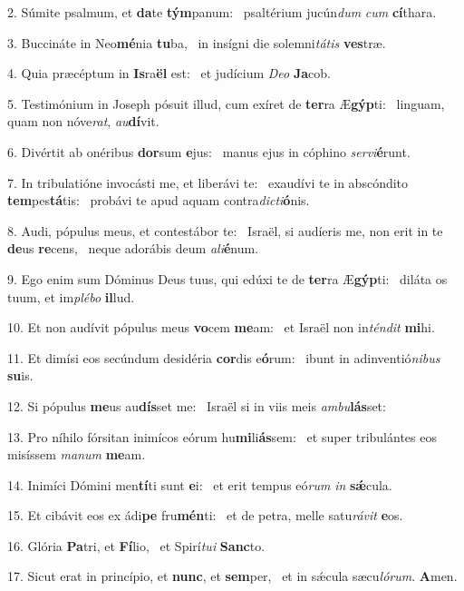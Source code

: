 2. Súmite psalmum, et \textbf{da}te \textbf{tým}panum: \ast\  psaltérium jucún\textit{dum} \textit{cum} \textbf{cí}thara.\

3. Buccináte in Neo\textbf{mé}nia \textbf{tu}ba, \ast\  in insígni die solemni\textit{tá}\textit{tis} \textbf{ves}træ.\

4. Quia præcéptum in \textbf{Is}ra\textbf{ël} est: \ast\  et judícium \textit{De}\textit{o} \textbf{Ja}cob.\

5. Testimónium in Joseph pósuit illud, cum exíret de \textbf{ter}ra Æ\textbf{gýp}ti: \ast\  linguam, quam non nóve\textit{rat}, \textit{au}\textbf{dí}vit.\

6. Divértit ab onéribus \textbf{dor}sum \textbf{e}jus: \ast\  manus ejus in cóphino \textit{ser}\textit{vi}\textbf{é}runt.\

7. In tribulatióne invocásti me, et liberávi te: \dag\  exaudívi te in abscóndito \textbf{tem}pes\textbf{tá}tis: \ast\  probávi te apud aquam contra\textit{dic}\textit{ti}\textbf{ó}nis.\

8. Audi, pópulus meus, et contestábor te: \dag\  Israël, si audíeris me, non erit in te \textbf{de}us \textbf{re}cens, \ast\  neque adorábis deum \textit{a}\textit{li}\textbf{é}num.\

9. Ego enim sum Dóminus Deus tuus, qui edúxi te de \textbf{ter}ra Æ\textbf{gýp}ti: \ast\  diláta os tuum, et im\textit{plé}\textit{bo} \textbf{il}lud.\

10. Et non audívit pópulus meus \textbf{vo}cem \textbf{me}am: \ast\  et Israël non in\textit{tén}\textit{dit} \textbf{mi}hi.\

11. Et dimísi eos secúndum desidéria \textbf{cor}dis e\textbf{ó}rum: \ast\  ibunt in adinventió\textit{ni}\textit{bus} \textbf{su}is.\

12. Si pópulus \textbf{me}us au\textbf{dís}set me: \ast\  Israël si in viis meis \textit{am}\textit{bu}\textbf{lás}set:\

13. Pro níhilo fórsitan inimícos eórum hu\textbf{mi}li\textbf{ás}sem: \ast\  et super tribulántes eos misíssem \textit{ma}\textit{num} \textbf{me}am.\

14. Inimíci Dómini men\textbf{tí}ti sunt \textbf{e}i: \ast\  et erit tempus eó\textit{rum} \textit{in} \textbf{sǽ}cula.\

15. Et cibávit eos ex ádi\textbf{pe} fru\textbf{mén}ti: \ast\  et de petra, melle satu\textit{rá}\textit{vit} \textbf{e}os.\

16. Glória \textbf{Pa}tri, et \textbf{Fí}lio, \ast\  et Spirí\textit{tu}\textit{i} \textbf{Sanc}to.\

17. Sicut erat in princípio, et \textbf{nunc}, et \textbf{sem}per, \ast\  et in sǽcula sæcu\textit{ló}\textit{rum}. \textbf{A}men.\

